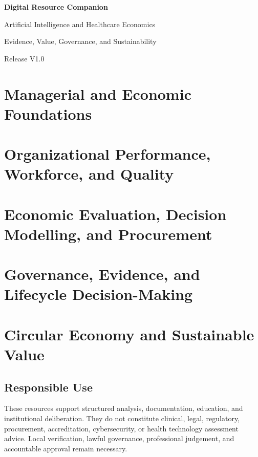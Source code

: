 \documentclass[11pt,openany]{book}
\begin{document}
\frontmatter
\begin{titlepage}\centering\vspace*{2cm}
{\Huge\bfseries Digital Resource Companion\par}\vspace{0.7cm}
{\Large Artificial Intelligence and Healthcare Economics\par}\vspace{0.3cm}
{\large Evidence, Value, Governance, and Sustainability\par}\vfill
{\large Release V1.0\par}\end{titlepage}
\tableofcontents
\mainmatter
\part{Managerial and Economic Foundations}



\part{Organizational Performance, Workforce, and Quality}


\part{Economic Evaluation, Decision Modelling, and Procurement}




\part{Governance, Evidence, and Lifecycle Decision-Making}



\part{Circular Economy and Sustainable Value}



\backmatter
\chapter*{Responsible Use}
These resources support structured analysis, documentation, education, and
institutional deliberation. They do not constitute clinical, legal, regulatory,
procurement, accreditation, cybersecurity, or health technology assessment advice.
Local verification, lawful governance, professional judgement, and accountable
approval remain necessary.
\end{document}
